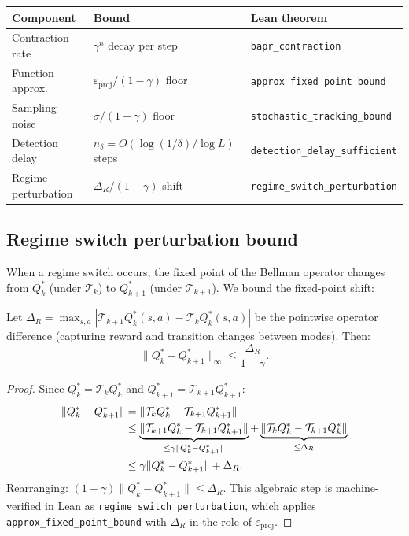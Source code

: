 \begin{center}
\begin{tabular}{lll}
\toprule
\textbf{Component} & \textbf{Bound} & \textbf{Lean theorem} \\
\midrule
Contraction rate & $\gamma^n$ decay per step & \texttt{bapr\_contraction} \\
Function approx. & $\varepsilon_{\text{proj}}/(1-\gamma)$ floor & \texttt{approx\_fixed\_point\_bound} \\
Sampling noise & $\sigma/(1-\gamma)$ floor & \texttt{stochastic\_tracking\_bound} \\
Detection delay & $n_\delta = O(\log(1/\delta)/\log L)$ steps & \texttt{detection\_delay\_sufficient} \\
Regime perturbation & $\Delta_R/(1-\gamma)$ shift & \texttt{regime\_switch\_perturbation} \\
\bottomrule
\end{tabular}
\end{center}

\subsection{Regime switch perturbation bound}

When a regime switch occurs, the fixed point of the Bellman operator changes from $Q^*_k$ (under $\mathcal{T}_k$) to $Q^*_{k+1}$ (under $\mathcal{T}_{k+1}$). We bound the fixed-point shift:

\begin{lemma}
    \label{lem:perturbation}
    Let $\Delta_R = \max_{s,a} |\mathcal{T}_{k+1} Q^*_k(s,a) - \mathcal{T}_k Q^*_k(s,a)|$ be the pointwise operator difference (capturing reward and transition changes between modes). Then:
    \begin{equation}
        \|Q^*_k - Q^*_{k+1}\|_\infty \leq \frac{\Delta_R}{1 - \gamma}.
    \end{equation}
\end{lemma}
\begin{proof}
Since $Q^*_k = \mathcal{T}_k Q^*_k$ and $Q^*_{k+1} = \mathcal{T}_{k+1} Q^*_{k+1}$:
\begin{align}
    \|Q^*_k - Q^*_{k+1}\| &= \|\mathcal{T}_k Q^*_k - \mathcal{T}_{k+1} Q^*_{k+1}\| \notag \\
    &\leq \underbrace{\|\mathcal{T}_{k+1} Q^*_k - \mathcal{T}_{k+1} Q^*_{k+1}\|}_{\leq \gamma\|Q^*_k - Q^*_{k+1}\|} + \underbrace{\|\mathcal{T}_k Q^*_k - \mathcal{T}_{k+1} Q^*_k\|}_{\leq \Delta_R} \notag \\
    &\leq \gamma \|Q^*_k - Q^*_{k+1}\| + \Delta_R.
\end{align}
Rearranging: $(1-\gamma)\|Q^*_k - Q^*_{k+1}\| \leq \Delta_R$. This algebraic step is machine-verified in Lean as \texttt{regime\_switch\_perturbation}, which applies \texttt{approx\_fixed\_point\_bound} with $\Delta_R$ in the role of $\varepsilon_{\text{proj}}$.
\end{proof}

